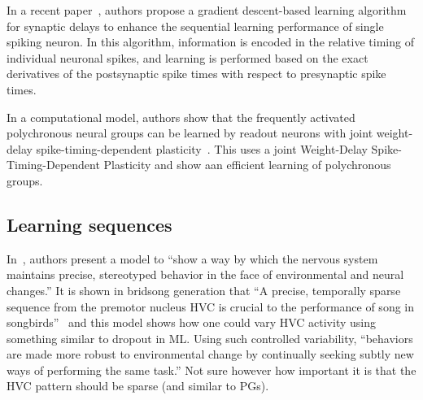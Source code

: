 \documentclass[brainsci, %
               review,submit,pdftex,moreauthors%
               ]{Definitions/mdpi}
\begin{document}
In a recent paper~\citep{luo_supervised_2022}, authors propose a gradient descent-based learning algorithm for synaptic delays to enhance the sequential learning performance of single spiking neuron. In this algorithm, information is encoded in the relative timing of individual neuronal spikes, and learning is performed based on the exact derivatives of the postsynaptic spike times with respect to presynaptic spike times.

In a computational model, authors show that the frequently activated polychronous neural groups can be learned by readout neurons with joint weight-delay spike-timing-dependent plasticity~\citep{sun_learning_2016}. This uses a joint Weight-Delay Spike-Timing-Dependent Plasticity and show aan efficient learning of polychronous groups.

\subsection{Learning sequences}\label{learning-sequences}
In~\citep{duffy_variation_2019}, authors present a model to ``show a way by which the nervous system maintains precise, stereotyped behavior in the face of environmental and neural changes.'' It is shown in bridsong generation that ``A precise, temporally sparse sequence from the premotor nucleus HVC is crucial to the performance of song in songbirds''~\citep{suthers_motor_2002,wild_descending_1993,yu_temporal_1996} and this model shows how one could vary HVC activity using something similar to dropout in ML. Using such controlled variability, ``behaviors are made more robust to environmental change by continually seeking subtly new ways of performing the same task.'' Not sure however how important it is that the HVC pattern should be sparse (and similar to PGs).
\end{document}

